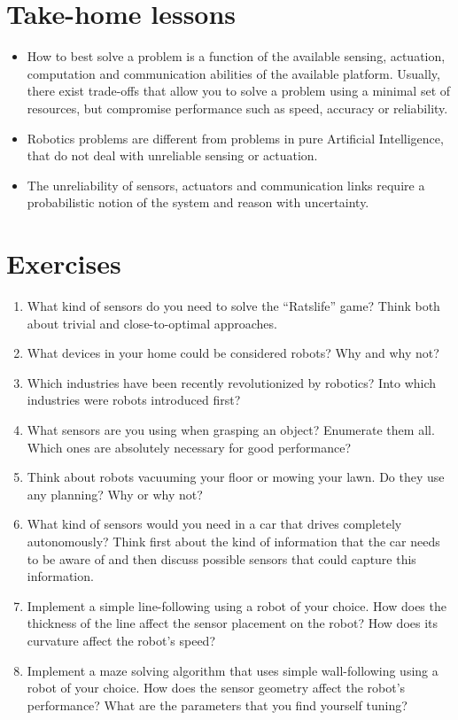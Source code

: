 \section*{Take-home lessons}
\begin{itemize}
\item How to best solve a problem is a function of the available sensing, actuation, computation and communication abilities of the available platform. Usually, there exist trade-offs that allow you to solve a problem using a minimal set of resources, but compromise performance such as speed, accuracy or reliability.
\item Robotics problems are different from problems in pure Artificial Intelligence, that do not deal with unreliable sensing or actuation.
\item The unreliability of sensors, actuators and communication links require a probabilistic notion of the system and reason with uncertainty.
\end{itemize}

\section*{Exercises}\small
\begin{enumerate}
\item What kind of sensors do you need to solve the ``Ratslife'' game? Think both about trivial and close-to-optimal approaches.
\item What devices in your home could be considered robots? Why and why not?
\item Which industries have been recently revolutionized by robotics? Into which industries were robots introduced first?
\item What sensors are you using when grasping an object? Enumerate them all. Which ones are absolutely necessary for good performance?
\item Think about robots vacuuming your floor or mowing your lawn. Do they use any planning? Why or why not?
\item What kind of sensors would you need in a car that drives completely autonomously? Think first about the kind of information that the car needs to be aware of and then discuss possible sensors that could capture this information.
\item Implement a simple line-following using a robot of your choice. How does the thickness of the line affect the sensor placement on the robot? How does its curvature affect the robot's speed?
\item Implement a maze solving algorithm that uses simple wall-following using a robot of your choice. How does the sensor geometry affect the robot's performance? What are the parameters that you find yourself tuning?
\end{enumerate}\normalsize


